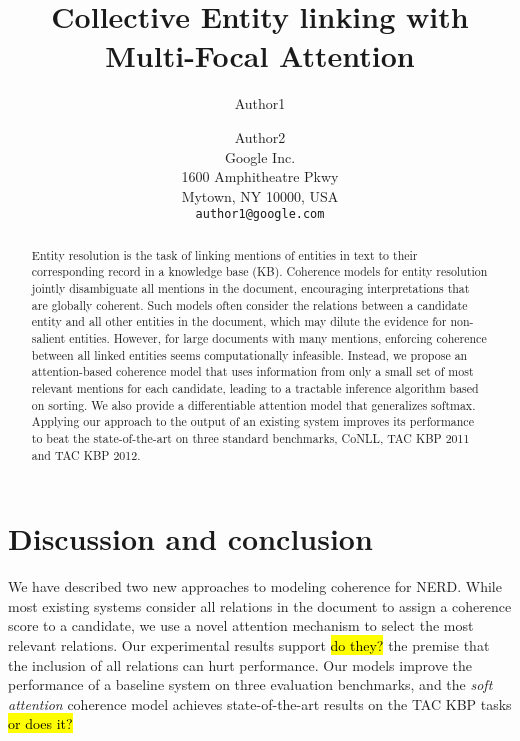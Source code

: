 \documentclass[11pt]{article}
\title{Collective Entity linking with Multi-Focal Attention}
\author{Author1 \and Author2\\
	    Google Inc. \\
	    1600 Amphitheatre Pkwy\\
	    Mytown, NY 10000, USA\\
	    {\tt author1@google.com}}
\date{}
\begin{document}
\maketitle

\begin{abstract}
Entity resolution is the task of linking mentions of entities in text
to their corresponding record in a knowledge base (KB). Coherence
models for entity resolution jointly disambiguate all mentions in the
document,  encouraging interpretations that are globally
coherent. Such models often consider the relations between a candidate
entity and all other entities in the document, which may dilute the
evidence for non-salient entities. However, for large documents with
many mentions, enforcing coherence between all linked entities seems
computationally infeasible. Instead, we propose an attention-based coherence
model that uses information from only a small set of most relevant
mentions for each candidate, leading to a tractable inference
algorithm based on sorting. We also provide a differentiable attention
model that generalizes softmax. Applying our approach to the output of an existing system
improves its performance to beat the state-of-the-art on three
standard benchmarks, CoNLL, TAC KBP 2011 and TAC KBP 2012.
\end{abstract}










\section{Discussion and conclusion}
We have described two new approaches to modeling coherence for NERD. While most existing systems consider all relations in the document to assign a coherence score to a candidate, we use a novel attention mechanism to select the most relevant relations. Our experimental results support \hl{do they?} the premise that the inclusion of all relations can hurt performance. Our models improve the performance of a baseline system on three evaluation benchmarks, and the \emph{soft attention} coherence model achieves state-of-the-art results on the TAC KBP tasks \hl{or does it?}




\small


\normalsize 
\end{document}

